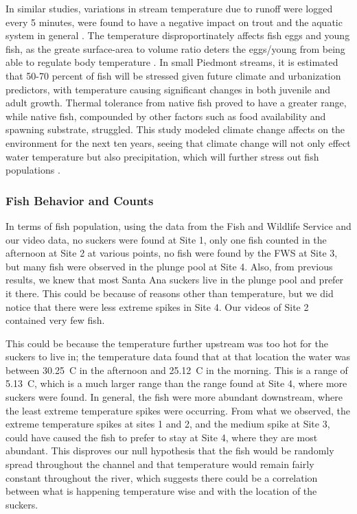 \documentclass{article}\usepackage[]{graphicx}\usepackage[]{color}
\begin{document}
In similar studies, variations in stream temperature due to runoff were logged every 5 minutes, were found to have a negative impact on trout and the aquatic system in general \citep{jones2007effect}. The temperature disproportinately affects fish eggs and young fish, as the greate surface-area to volume ratio deters the eggs/young from being able to regulate body temperature \citep{Nelson09} . In small Piedmont streams, it is estimated that 50-70 percent of fish will be stressed given future climate and urbanization predictors, with temperature causing significant changes in both juvenile and adult growth. Thermal tolerance from native fish proved to have a greater range, while native fish, compounded by other factors such as food availability and spawning substrate, struggled. This study modeled climate change affects on the environment for the next ten years, seeing that climate change will not only effect water temperature but also precipitation, which will further stress out fish populations \citep{Nelson09}.

\subsubsection{Fish Behavior and Counts}

In terms of fish population, using the data from the Fish and Wildlife Service and our video data, no suckers were found at Site 1, only one fish counted in the afternoon at Site 2 at various points, no fish were found by the FWS at Site 3, but many fish were observed in the plunge pool at Site 4. Also, from previous results, we knew that most Santa Ana suckers live in the plunge pool and prefer it there. This could be because of reasons other than temperature, but we did notice that there were less extreme spikes in Site 4. Our videos of Site 2 contained very few fish. 

This could be because the temperature further upstream was too hot for the suckers to live in; the temperature data found that at that location the water was between 30.25\textdegree~C in the afternoon and 25.12\textdegree~C in the morning. This is a range of 5.13\textdegree~C, which is a much larger range than the range found at Site 4, where more suckers were found. In general, the fish were more abundant downstream, where the least extreme temperature spikes were occurring. From what we observed, the extreme temperature spikes at sites 1 and 2, and the medium spike at Site 3, could have caused the fish to prefer to stay at Site 4, where they are most abundant. This disproves our null hypothesis that the fish would be randomly spread throughout the channel and that temperature would remain fairly constant throughout the river, which suggests there could be a correlation between what is happening temperature wise and with the location of the suckers.
\end{document}
